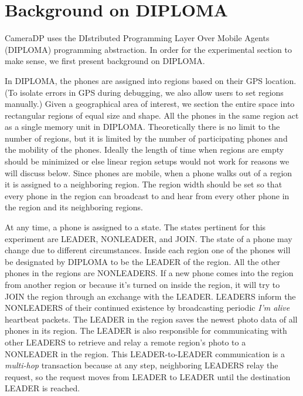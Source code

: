 \chapter{Background on DIPLOMA}

CameraDP uses the DIstributed Programming Layer Over Mobile Agents (DIPLOMA) \cite{diploma} programming abstraction. In order for the experimental section to make sense, we first present background on DIPLOMA. 

In DIPLOMA, the phones are assigned into regions \cite{virtualnode} based on their GPS location. (To isolate errors in GPS during debugging, we also allow users to set regions manually.) Given a geographical area of interest, we section the entire space into rectangular regions of equal size and shape. All the phones in the same region act as a single memory unit in DIPLOMA. Theoretically there is no limit to the number of regions, but it is limited by the number of participating phones and the mobility of the phones. Ideally the length of time when regions are empty should be minimized or else linear region setups would not work for reasons we will discuss below. Since phones are mobile, when a phone walks out of a region it is assigned to a neighboring region. The region width should be set so that every phone in the region can broadcast to and hear from every other phone in the region and its neighboring regions.

At any time, a phone is assigned to a state. The states pertinent for this experiment are LEADER, NONLEADER, and JOIN. The state of a phone may change due to different circumstances. Inside each region one of the phones will be designated by DIPLOMA to be the LEADER of the region. All the other phones in the regions are NONLEADERS. If a new phone comes into the region from another region or because it's turned on inside the region, it will try to JOIN the region through an exchange with the LEADER. LEADERS inform the NONLEADERS of their continued existence by broadcasting periodic {\it I'm alive} heartbeat packets. The LEADER in the region saves the newest photo data of all phones in its region. The LEADER is also responsible for communicating with other LEADERS to retrieve and relay a remote region's photo to a NONLEADER in the region. This LEADER-to-LEADER communication is a {\it multi-hop} transaction because at any step, neighboring LEADERS relay the request, so the request moves from LEADER to LEADER until the destination LEADER is reached.

